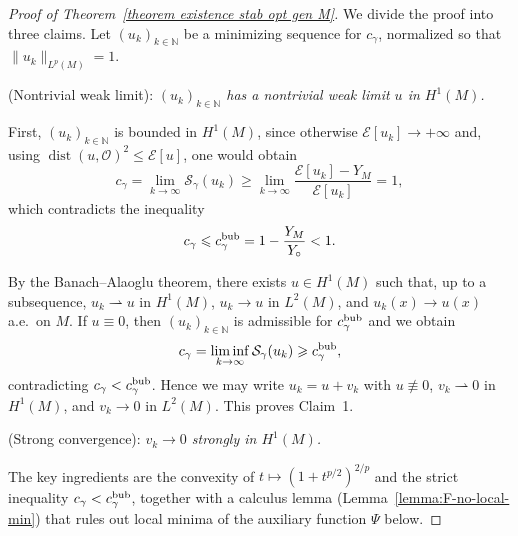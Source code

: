 \documentclass[reqno,11pt]{amsart}
\numberwithin{equation}{section}
\theoremstyle{definition}
\theoremstyle{remark}
\DeclareMathOperator{\dist}{dist}
\begin{document}
\begin{proof}[Proof of Theorem~\ref{theorem existence stab opt gen M}]
We divide the proof into three claims.
Let $(u_k)_{k \in \mathbb{N}}$ be a minimizing sequence for $c_\gamma$, normalized so that $\|u_k\|_{L^p(M)} = 1$. 

\medskip
{} {\rm (Nontrivial weak limit):} {\it $(u_k)_{k \in \mathbb{N}}$ has a nontrivial weak limit $u$ in $H^1(M)$.}

\smallskip
{} First, $(u_k)_{k \in \mathbb{N}}$ is bounded in $H^1(M)$, since otherwise $\mathcal{E}[u_k] \to +\infty$ and, using $\dist(u, \mathscr{O})^2 \leqslant \mathcal E[u]$, one would obtain
\[
c_\gamma = \lim_{k \to \infty} \mathcal{S}_\gamma(u_k) \geqslant \lim_{k \to \infty} \frac{\mathcal E[u_k] - Y_M}{\mathcal E[u_k]} = 1,
\]
which contradicts the inequality
\[
c_\gamma\leqslant c_\gamma^{\rm bub} = 1 - \frac{Y_M}{Y_\circ} < 1.
\]

By the Banach--Alaoglu theorem, there exists $u \in H^1(M)$ such that, up to a subsequence, $u_k \rightharpoonup u$ in $H^1(M)$, $u_k \to u$ in $L^2(M)$, and $u_k(x) \to u(x)$ a.e.\ on $M$. If $u \equiv 0$, then $(u_k)_{k \in \mathbb{N}}$ is admissible for $c_\gamma^{\rm bub}$ and we obtain
\[
c_\gamma = \liminf_{k \to \infty} \mathcal{S}_\gamma(u_k) \geqslant c_\gamma^{\rm bub},
\]
contradicting $c_\gamma < c_\gamma^{\rm bub}$. Hence we may write $u_k = u + v_k$ with $u \not\equiv 0$, $v_k \rightharpoonup 0$ in $H^1(M)$, and $v_k \to 0$ in $L^2(M)$. This proves Claim~1.

\medskip
{} {\rm (Strong convergence):} {\it $v_k \to 0$ strongly in $H^1(M)$.}

\smallskip
{} The key ingredients are the convexity of $t \mapsto (1 + t^{p/2})^{2/p}$ and the strict inequality $c_\gamma < c_\gamma^{\rm bub}$, together with a calculus lemma (Lemma~\ref{lemma:F-no-local-min}) that rules out local minima of the auxiliary function $\Psi$ below.


\end{proof}
\end{document}
